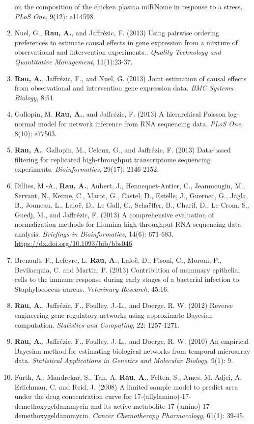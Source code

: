 \documentclass[11pt, a4paper]{awesome-cv}
\begin{document}
\begin{enumerate}
  on the composition of the chicken plasma miRNome in response to a
  stress. \emph{PLoS One}, 9(12): e114598.
\item
  Nuel, G., \textbf{Rau, A.}, and Jaffrézic, F. (2013) Using pairwise
  ordering preferences to estimate causal effects in gene expression
  from a mixture of observational and intervention experiments..
  \emph{Quality Technology and Quantitative Management}, 11(1):23-37.
\item
  \textbf{Rau, A.}, Jaffrézic, F., and Nuel, G. (2013) Joint estimation
  of causal effects from observational and intervention gene expression
  data. \emph{BMC Systems Biology}, 8:51.
\item
  Gallopin, M. \textbf{Rau, A.}, and Jaffrézic, F. (2013) A hierarchical
  Poisson log-normal model for network inference from RNA sequencing
  data. \emph{PLoS One}, 8(10): e77503.
\item
  \textbf{Rau, A.}, Gallopin, M., Celeux, G., and Jaffrézic, F. (2013)
  Data-based filtering for replicated high-throughput transcriptome
  sequencing experiments. \emph{Bioinformatics}, 29(17): 2146-2152.
\item
  Dillies, M.-A., \textbf{Rau, A.}, Aubert, J., Hennequet-Antier, C.,
  Jeanmougin, M., Servant, N., Keime, C., Marot, G., Castel, D.,
  Estelle, J., Guernec, G., Jagla, B., Jouneau, L., Laloë, D., Le Gall,
  C., Schaëffer, B., Charif, D., Le Crom, S., Guedj, M., and Jaffrézic,
  F. (2013) A comprehensive evaluation of normalization methods for
  Illumina high-throughput RNA sequencing data analysis. \emph{Briefings
  in Bioinformatics}, 14(6): 671-683.
  \url{https://dx.doi.org/10.1093/bib/bbs046}
\item
  Brenault, P., Lefevre, L. \textbf{Rau, A.}, Laloë, D., Pisoni, G.,
  Moroni, P., Bevilacquia, C. and Martin, P. (2013) Contribution of
  mammary epithelial cells to the immune response during early stages of
  a bacterial infection to Staphylococcus aureus. \emph{Veterinary
  Research}, 45:16.
\item
  \textbf{Rau, A.}, Jaffrézic, F., Foulley, J.-L., and Doerge, R. W.
  (2012) Reverse engineering gene regulatory networks using approximate
  Bayesian computation. \emph{Statistics and Computing}, 22: 1257-1271.
\item
  \textbf{Rau, A.}, Jaffrézic, F., Foulley, J.-L., and Doerge, R. W.
  (2010) An empirical Bayesian method for estimating biological networks
  from temporal microarray data. \emph{Statistical Applications in
  Genetics and Molecular Biology}, 9(1): 9.
\item
  Furth, A., Mandrekar, S., Tan, A. \textbf{Rau, A.}, Felten, S., Ames,
  M. Adjei, A. Erlichman, C. and Reid, J. (2008) A limited sample model
  to predict area under the drug concentration curve for
  17-(allylamino)-17-demethoxygeldanamycin and its active metabolite
  17-(amino)-17-demethoxygeldanomycin. \emph{Cancer Chemotherapy
  Pharmacology}, 61(1): 39-45.
\end{enumerate}
\end{document}
